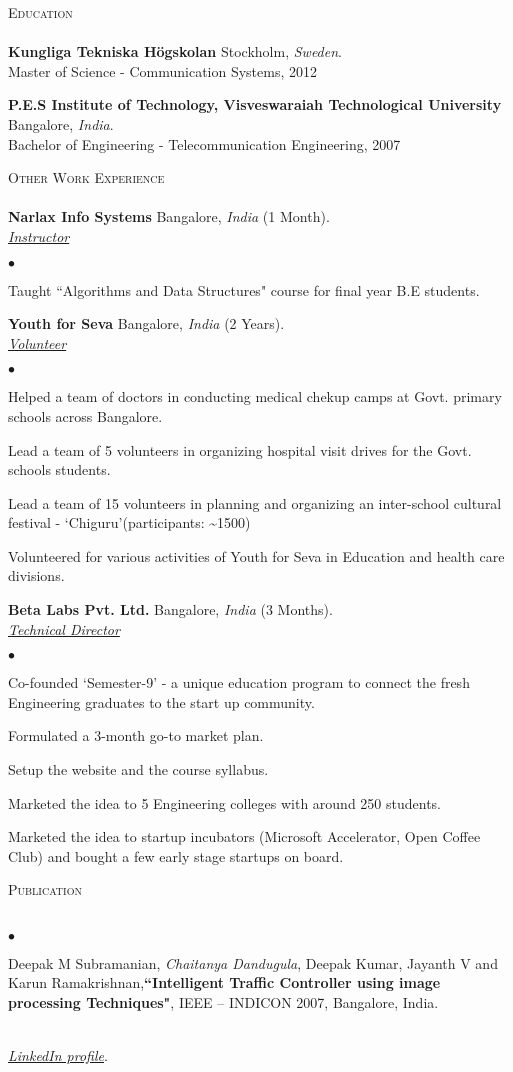 \documentclass[a4paper]{article}
\newcommand{\lineunder}{\vspace*{-8pt} \\ \hspace*{-18pt} \hrulefill \\}
\newcommand{\header}[1]{{\hspace*{-15pt}\vspace*{6pt} \textsc{#1}} \vspace*{-6pt} \lineunder}
\newcommand{\employer}[4]{{ \textbf{#1} #2  (#3).\\ \underline{\emph{#4}}\\  }}
\newenvironment{achievements}{\begin{list}{$\bullet$}{\topsep 0pt \itemsep -2pt}}{\vspace*{4pt}\end{list}}
\newcommand{\school}[3]{
 \textbf{#1} #2 \\\vspace*{3pt} #3\\
\vspace*{5pt}
}
\begin{document}
\header{Education}

\school{Kungliga Tekniska H\"{o}gskolan}{Stockholm, \textit{Sweden}.}
{Master of Science - Communication Systems, 2012}

\school{P.E.S Institute of Technology, Visveswaraiah Technological University}{Bangalore, \textit{India}.}{Bachelor of Engineering - Telecommunication Engineering, 2007}

\break
\header{Other Work Experience}
\employer{Narlax Info Systems} {Bangalore, \textit{India}}{1 Month}{Instructor}
	\begin{achievements}
	\item Taught ``Algorithms and Data Structures" course for final year B.E students.
	\end{achievements}

\employer{Youth for Seva}{Bangalore, \textit{India}}{2 Years}{Volunteer}
\begin{achievements}
\item Helped a team of doctors in conducting medical chekup camps at Govt. primary schools across Bangalore.
\item Lead a team of 5 volunteers in organizing hospital visit drives for the Govt. schools students.
\item Lead a team of 15 volunteers in planning and organizing an inter-school cultural festival - `Chiguru'(participants: \textasciitilde 1500)
\item Volunteered for various activities of Youth for Seva in Education and health care divisions.
\end{achievements}

\employer{Beta Labs Pvt. Ltd.}{Bangalore, \textit{India}}{3 Months}{Technical Director}
\begin{achievements}
\item Co-founded `Semester-9' - a unique education program to connect the fresh Engineering graduates to the start up community.
\item Formulated a 3-month go-to market plan.
\item Setup the website and the course syllabus.
\item Marketed the idea to 5 Engineering colleges with around 250 students.
\item Marketed the idea to startup incubators (Microsoft Accelerator, Open Coffee Club) and bought a few early stage startups on board.
\end{achievements}

\header{Publication}
\begin{achievements}
\item  Deepak M Subramanian, \emph{Chaitanya Dandugula}, Deepak Kumar, Jayanth V and Karun Ramakrishnan,\textbf{``Intelligent Traffic Controller using image processing Techniques"}, IEEE – INDICON 2007, Bangalore, India.
\end{achievements}

\hspace*{-18pt} \hrulefill \\
\textit{\href{https://www.linkedin.com/in/dandugula/}{LinkedIn profile}}.\\
\end{document}
